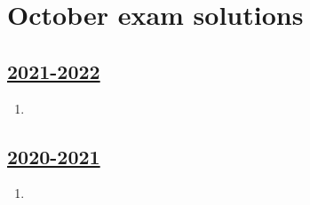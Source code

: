 
\newpage
\thispagestyle{empty}
\section{October exam solutions}
 


\subsection[2021-2022]{\hyperref[sec:kr_01_2021_2022]{2021-2022}}
\label{sec:sol_kr_01_2021_2022} %



\begin{enumerate}

\item 


\end{enumerate}
    

\subsection[2020-2021]{\hyperref[sec:kr_01_2020_2021]{2020-2021}}
\label{sec:sol_kr_01_2020_2021} %



\begin{enumerate}
    
    
    
    \item
 
 
\end{enumerate}


